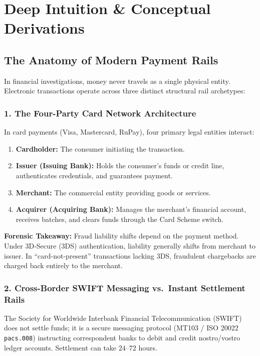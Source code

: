 \section{Deep Intuition \& Conceptual Derivations}

\subsection{The Anatomy of Modern Payment Rails}
In financial investigations, money never travels as a single physical entity. Electronic transactions operate across three distinct structural rail archetypes:

\subsubsection{1. The Four-Party Card Network Architecture}
In card payments (Visa, Mastercard, RuPay), four primary legal entities interact:
\begin{enumerate}
    \item \textbf{Cardholder:} The consumer initiating the transaction.
    \item \textbf{Issuer (Issuing Bank):} Holds the consumer's funds or credit line, authenticates credentials, and guarantees payment.
    \item \textbf{Merchant:} The commercial entity providing goods or services.
    \item \textbf{Acquirer (Acquiring Bank):} Manages the merchant's financial account, receives batches, and clears funds through the Card Scheme switch.
\end{enumerate}
\textbf{Forensic Takeaway:} Fraud liability shifts depend on the payment method. Under 3D-Secure (3DS) authentication, liability generally shifts from merchant to issuer. In ``card-not-present'' transactions lacking 3DS, fraudulent chargebacks are charged back entirely to the merchant.

\subsubsection{2. Cross-Border SWIFT Messaging vs.~Instant Settlement Rails}
The Society for Worldwide Interbank Financial Telecommunication (SWIFT) does not settle funds; it is a secure messaging protocol (MT103 / ISO 20022 \texttt{pacs.008}) instructing correspondent banks to debit and credit nostro/vostro ledger accounts. Settlement can take $24$--$72$ hours. 


